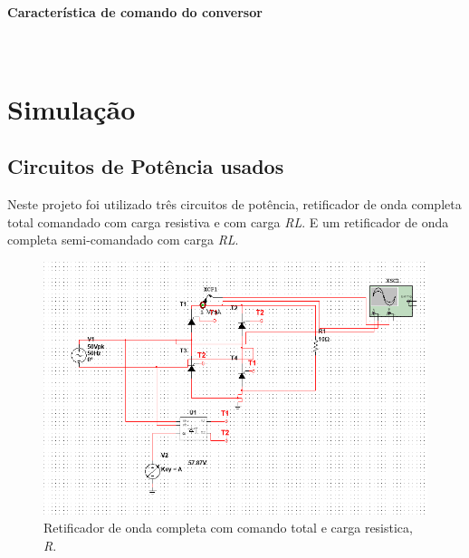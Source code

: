 \documentclass[a4paper,11pt]{article}
\numberwithin{equation}{section}
\begin{document}
\paragraph{Característica de comando do conversor} \mbox{}\






\pagebreak
\section{Simulação}
\subsection{Circuitos de Potência usados}
Neste projeto foi utilizado três circuitos de potência, retificador de onda completa total comandado com carga resistiva e com carga \textit{RL}. E um retificador de onda completa semi-comandado com carga \textit{RL}. 

\begin{figure}[h]
	\centering
	\includegraphics[keepaspectratio=true, scale=0.5]{img/circuito1}
	\caption{Retificador de onda completa com comando total e carga resistica, \textit{R}.}
	\label{fig:circuit_3}
	\vspace{-0.8em}
\end{figure}
\end{document}
